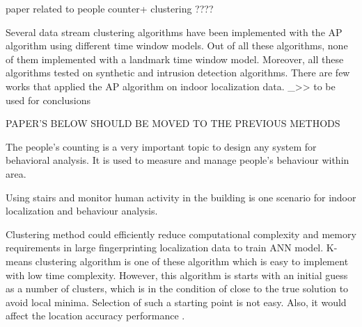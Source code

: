 \documentclass[../UNBThesis2.tex]{subfiles}
\begin{document}
paper related to people counter+ clustering ????

Several data stream clustering algorithms have been implemented with the AP algorithm using different time window models. Out of all these algorithms, none of them implemented with a landmark time window model. Moreover, all these algorithms tested on synthetic and intrusion detection algorithms. There are few works that applied the AP algorithm on indoor localization data. _>> to be used for conclusions



PAPER'S BELOW SHOULD BE MOVED TO THE PREVIOUS METHODS


The people’s counting is a very important topic to design any system for behavioral analysis. It is used to measure and manage people’s behaviour within area.

Using stairs and monitor human activity in the building is one scenario for indoor localization and behaviour analysis.


   


Clustering method could efficiently reduce computational complexity and memory requirements in large fingerprinting localization data to train ANN model. K-means clustering algorithm is one of these algorithm which is easy to implement with low time complexity. However, this algorithm is starts with an initial guess as a number of clusters, which is in the condition of close to the true solution to avoid local minima. Selection of such a starting point is not easy. Also, it would affect the location accuracy performance \cite{das2007automatic, ding2013fingerprinting}.
\end{document}
